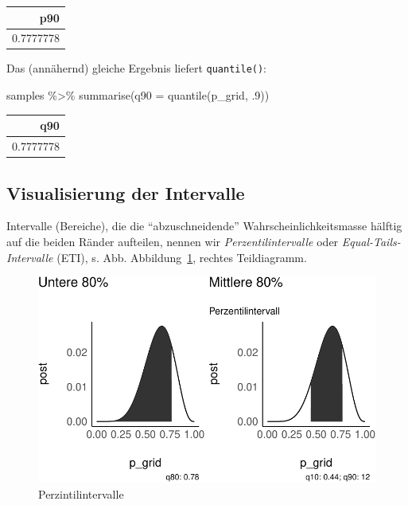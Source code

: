 \documentclass[
  a4paper,
  DIV=11]{scrreprt}
\newenvironment{Shaded}{\begin{snugshade}}{\end{snugshade}}
\newcommand{\AttributeTok}[1]{\textcolor[rgb]{0.40,0.45,0.13}{#1}}
\newcommand{\DecValTok}[1]{\textcolor[rgb]{0.68,0.00,0.00}{#1}}
\newcommand{\FunctionTok}[1]{\textcolor[rgb]{0.28,0.35,0.67}{#1}}
\newcommand{\NormalTok}[1]{\textcolor[rgb]{0.00,0.23,0.31}{#1}}
\newcommand{\SpecialCharTok}[1]{\textcolor[rgb]{0.37,0.37,0.37}{#1}}
\theoremstyle{definition}
\theoremstyle{remark}
\begin{document}
\begin{longtable}[]{@{}r@{}}
\toprule()
p90 \\
\midrule()
\endhead
0.7777778 \\
\bottomrule()
\end{longtable}

Das (annähernd) gleiche Ergebnis liefert \texttt{quantile()}:

\begin{Shaded}
\begin{Highlighting}[]
\NormalTok{samples }\SpecialCharTok{\%\textgreater{}\%} 
  \FunctionTok{summarise}\NormalTok{(}\AttributeTok{q90 =} \FunctionTok{quantile}\NormalTok{(p\_grid, .}\DecValTok{9}\NormalTok{))}
\end{Highlighting}
\end{Shaded}

\begin{longtable}[]{@{}r@{}}
\toprule()
q90 \\
\midrule()
\endhead
0.7777778 \\
\bottomrule()
\end{longtable}

\hypertarget{visualisierung-der-intervalle}{%
\subsection{Visualisierung der
Intervalle}\label{visualisierung-der-intervalle}}

Intervalle (Bereiche), die die ``abzuschneidende''
Wahrscheinlichkeitsmasse hälftig auf die beiden Ränder aufteilen, nennen
wir \emph{Perzentilintervalle} oder \emph{Equal-Tails-Intervalle} (ETI),
s. Abb. Abbildung~\ref{fig-eti}, rechtes Teildiagramm.

\begin{figure}

{\centering \includegraphics{./Post_files/figure-pdf/fig-eti-1.pdf}

}

\caption{\label{fig-eti}Perzintilintervalle}

\end{figure}
\end{document}
